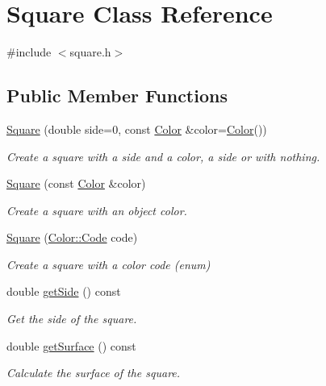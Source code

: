 \hypertarget{classSquare}{}\section{Square Class Reference}
\label{classSquare}


{\ttfamily \#include $<$square.\+h$>$}

\subsection*{Public Member Functions}
\begin{DoxyCompactItemize}
\item 
\hyperlink{classSquare_a7c70f007d73584e9414eab28a7aefe60}{Square} (double side=0, const \hyperlink{classColor}{Color} \&color=\hyperlink{classColor}{Color}())
\begin{DoxyCompactList}\small\item\em Create a square with a side and a color, a side or with nothing. \end{DoxyCompactList}\item 
\hyperlink{classSquare_a5d1815fef1fa705c09f440a4c4564bfc}{Square} (const \hyperlink{classColor}{Color} \&color)
\begin{DoxyCompactList}\small\item\em Create a square with an object color. \end{DoxyCompactList}\item 
\hyperlink{classSquare_ac8b92065c3eeb214430f4c1b6bd80db3}{Square} (\hyperlink{classColor_a20a7b04657c1d83fae5d54514d3f1622}{Color\+::\+Code} code)
\begin{DoxyCompactList}\small\item\em Create a square with a color code (enum) \end{DoxyCompactList}\item 
double \hyperlink{classSquare_ab670bd5d9126b09ebd7869670fb8f7c6}{get\+Side} () const
\begin{DoxyCompactList}\small\item\em Get the side of the square. \end{DoxyCompactList}\item 
double \hyperlink{classSquare_a5d71637e24b4fb2438fc6281f969837f}{get\+Surface} () const
\begin{DoxyCompactList}\small\item\em Calculate the surface of the square. \end{DoxyCompactList}\item 

\end{DoxyCompactItemize}
